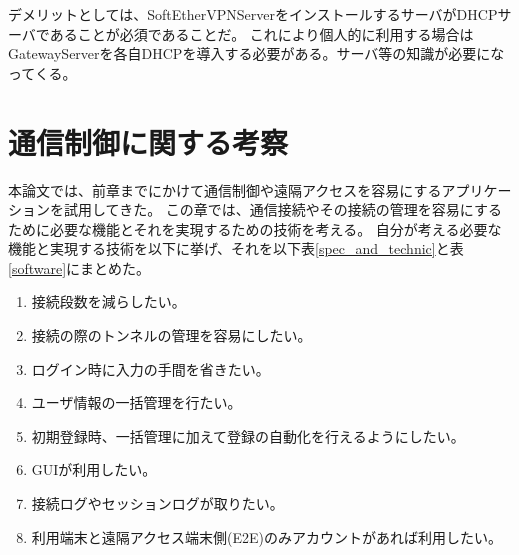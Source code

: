 \documentclass[11pt,a4j,titlepage]{jreport}
\begin{document}
デメリットとしては、SoftEtherVPNServerをインストールするサーバがDHCPサーバであることが必須であることだ。
これにより個人的に利用する場合はGatewayServerを各自DHCPを導入する必要がある。サーバ等の知識が必要になってくる。





\chapter{通信制御に関する考察}

本論文では、前章までにかけて通信制御や遠隔アクセスを容易にするアプリケーションを試用してきた。
この章では、通信接続やその接続の管理を容易にするために必要な機能とそれを実現するための技術を考える。
自分が考える必要な機能と実現する技術を以下に挙げ、それを以下表\ref{spec_and_technic}と表\ref{software}にまとめた。

\begin{enumerate}
    \setlength{\parskip}{0.1cm} %
    \setlength{\itemsep}{0.1cm} 
    \item 接続段数を減らしたい。
    \item 接続の際のトンネルの管理を容易にしたい。%
    \item ログイン時に入力の手間を省きたい。%
    \item ユーザ情報の一括管理を行たい。%
    \item 初期登録時、一括管理に加えて登録の自動化を行えるようにしたい。
    \item GUIが利用したい。
    \item 接続ログやセッションログが取りたい。
    \item 利用端末と遠隔アクセス端末側(E2E)のみアカウントがあれば利用したい。%
\end{enumerate}
\end{document}
